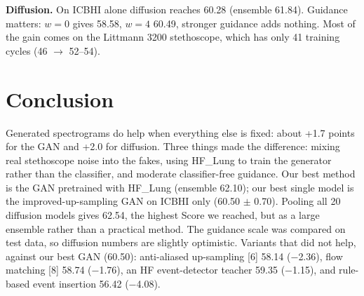 \documentclass[twoside,english]{article}
\renewcommand{\cite}[1]{[#1]}
\begin{document}
\textbf{Diffusion.} On ICBHI alone diffusion reaches 60.28 (ensemble 61.84). Guidance matters: $w=0$ gives 58.58, $w=4$ 60.49, stronger guidance adds nothing. Most of the gain comes on the Littmann 3200 stethoscope, which has only 41 training cycles (46 $\rightarrow$ 52--54).

\section{Conclusion}
Generated spectrograms do help when everything else is fixed: about +1.7 points for the GAN and +2.0 for diffusion. Three things made the difference: mixing real stethoscope noise into the fakes, using HF\_Lung to train the generator rather than the classifier, and moderate classifier-free guidance. Our best method is the GAN pretrained with HF\_Lung (ensemble 62.10); our best single model is the improved-up-sampling GAN on ICBHI only (60.50 $\pm$ 0.70). Pooling all 20 diffusion models gives 62.54, the highest Score we reached, but as a large ensemble rather than a practical method. The guidance scale was compared on test data, so diffusion numbers are slightly optimistic. Variants that did not help, against our best GAN (60.50): anti-aliased up-sampling \cite{6} 58.14 ($-$2.36), flow matching \cite{8} 58.74 ($-$1.76), an HF event-detector teacher 59.35 ($-$1.15), and rule-based event insertion 56.42 ($-$4.08).
\end{document}
